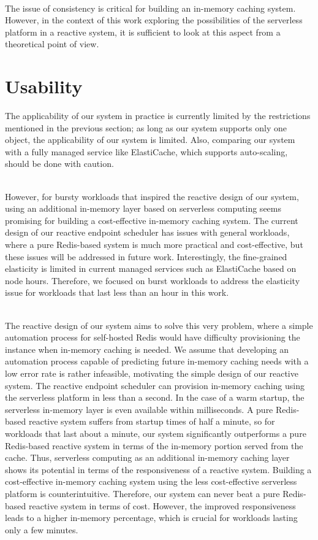 ~\\
The issue of consistency is critical for building an in-memory caching system. However, in the context of this work exploring the possibilities of the serverless platform in a reactive system, it is sufficient to look at this aspect from a theoretical point of view.  


\section{Usability}
\label{sec:usability}
The applicability of our system in practice is currently limited by the restrictions mentioned in the previous section; as long as our system supports only one object, the applicability of our system is limited. Also, comparing our system with a fully managed service like ElastiCache, which supports auto-scaling, should be done with caution. 

~\\
However, for bursty workloads that inspired the reactive design of our system, using an additional in-memory layer based on serverless computing seems promising for building a cost-effective in-memory caching system. The current design of our reactive endpoint scheduler has issues with general workloads, where a pure Redis-based system is much more practical and cost-effective, but these issues will be addressed in future work. Interestingly, the fine-grained elasticity is limited in current managed services such as ElastiCache based on node hours. Therefore, we focused on burst workloads to address the elasticity issue for workloads that last less than an hour in this work.

~\\
The reactive design of our system aims to solve this very problem, where a simple automation process for self-hosted Redis would have difficulty provisioning the instance when in-memory caching is needed. We assume that developing an automation process capable of predicting future in-memory caching needs with a low error rate is rather infeasible, motivating the simple design of our reactive system. The reactive endpoint scheduler can provision in-memory caching using the serverless platform in less than a second. In the case of a warm startup, the serverless in-memory layer is even available within milliseconds. A pure Redis-based reactive system suffers from startup times of half a minute, so for workloads that last about a minute, our system significantly outperforms a pure Redis-based reactive system in terms of the in-memory portion served from the cache. Thus, serverless computing as an additional in-memory caching layer shows its potential in terms of the responsiveness of a reactive system. Building a cost-effective in-memory caching system using the less cost-effective serverless platform is counterintuitive. Therefore, our system can never beat a pure Redis-based reactive system in terms of cost. However, the improved responsiveness leads to a higher in-memory percentage, which is crucial for workloads lasting only a few minutes.

